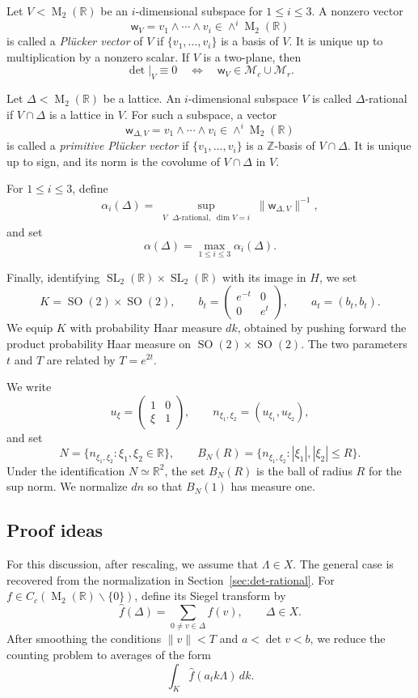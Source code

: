 \documentclass[reqno,11pt]{amsart}
\theoremstyle{definition}
\theoremstyle{remark}
\numberwithin{equation}{section}
\newcommand{\M}{\operatorname{M}}
\newcommand{\SL}{\operatorname{SL}}
\newcommand{\SO}{\operatorname{SO}}
\begin{document}
Let $V<\M_2(\mathbb R)$ be an $i$-dimensional subspace for $1\le i\le 3$. A nonzero vector
$$
\mathsf w_V=v_1\wedge\cdots\wedge v_i
\in\wedge^i\M_2(\mathbb R)
$$
is called a \emph{Pl\"ucker vector} of $V$ if
$\{v_1,\ldots,v_i\}$ is a basis of $V$. It is unique up to multiplication
by a nonzero scalar. If $V$ is a two-plane, then
$$
\det|_V\equiv0
\quad\Longleftrightarrow\quad
\mathsf w_V\in\mathcal M_c\cup\mathcal M_r.
$$

Let $\Delta<\M_2(\mathbb R)$ be a lattice. An $i$-dimensional subspace
$V$ is called $\Delta$-rational if $V\cap\Delta$ is a lattice in $V$.
For such a subspace, a vector
$$
\mathsf w_{\Delta,V}
=
v_1\wedge\cdots\wedge v_i
\in\wedge^i\M_2(\mathbb R)
$$
is called a \emph{primitive Pl\"ucker vector} if
$\{v_1,\ldots,v_i\}$ is a $\mathbb Z$-basis of $V\cap\Delta$. It is
unique up to sign, and its norm is the covolume of $V\cap\Delta$ in $V$.

For $1\le i\le3$, define
$$
\alpha_i(\Delta)
=
\sup_{\substack{V\text{ $\Delta$-rational},\; \dim V=i}}
\|\mathsf w_{\Delta,V}\|^{-1},
$$
and set
$$
\alpha(\Delta)=\max_{1\le i\le3}\alpha_i(\Delta).
$$

Finally, identifying $\SL_2(\mathbb R)\times\SL_2(\mathbb R)$ with its
image in $H$, we set
$$
K=\SO(2)\times\SO(2),\qquad
b_t=
\begin{pmatrix}
e^{-t}&0\\
0&e^t
\end{pmatrix},
\qquad
a_t=(b_t,b_t).
$$
We equip $K$ with probability Haar measure $dk$, obtained by pushing
forward the product probability Haar measure on
$\SO(2)\times\SO(2)$.
The two parameters $t$ and $T$ are related by $ T=e^{2t}$.


We write
$$
u_\xi=
\begin{pmatrix}
1&0\\
\xi&1
\end{pmatrix},
\qquad
n_{\xi_1,\xi_2}=(u_{\xi_1},u_{\xi_2}),
$$
and set
$$
N=\{n_{\xi_1,\xi_2}:\xi_1,\xi_2\in\mathbb R\},
\qquad
B_N(R)=\{n_{\xi_1,\xi_2}:|\xi_1|,|\xi_2|\le R\}.
$$
Under the identification $N\simeq\mathbb R^2$, the set $B_N(R)$ is the
ball of radius $R$ for the sup norm. We normalize $dn$ so that $B_N(1)$
has measure one.

\subsection*{Proof ideas}\label{idea}
For this discussion, after rescaling, we assume that $\Lambda\in X$. The
general case is recovered from the normalization in
Section~\ref{sec:det-rational}.
For $f\in C_c(\M_2(\mathbb R)\smallsetminus\{0\})$, define its Siegel transform by
$$
\widehat f(\Delta)
=
\sum_{0\ne v\in\Delta}f(v),
\qquad \Delta\in X.
$$
After smoothing the conditions $\|v\|<T$ and $a<\det v<b$, we reduce the
counting problem to averages of the form
$$
\int_K\widehat f(a_tk\Lambda)\,dk.
$$
\end{document}
